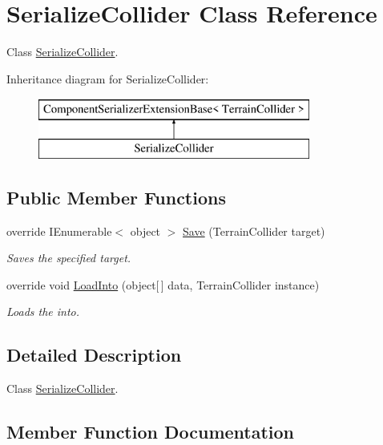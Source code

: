 \hypertarget{class_serialize_collider}{}\section{Serialize\+Collider Class Reference}
\label{class_serialize_collider}


Class \hyperlink{class_serialize_collider}{Serialize\+Collider}.  


Inheritance diagram for Serialize\+Collider\+:\begin{figure}[H]
\begin{center}
\leavevmode
\includegraphics[height=2.000000cm]{class_serialize_collider}
\end{center}
\end{figure}
\subsection*{Public Member Functions}
\begin{DoxyCompactItemize}
\item 
override I\+Enumerable$<$ object $>$ \hyperlink{class_serialize_collider_af8330f26c986a715cb6bad3a1e018d77}{Save} (Terrain\+Collider target)
\begin{DoxyCompactList}\small\item\em Saves the specified target. \end{DoxyCompactList}\item 
override void \hyperlink{class_serialize_collider_ac18a5c1da6864b2a473e4741a832dc53}{Load\+Into} (object\mbox{[}$\,$\mbox{]} data, Terrain\+Collider instance)
\begin{DoxyCompactList}\small\item\em Loads the into. \end{DoxyCompactList}\end{DoxyCompactItemize}


\subsection{Detailed Description}
Class \hyperlink{class_serialize_collider}{Serialize\+Collider}. 



\subsection{Member Function Documentation}
\mbox{\label{class_serialize_collider_ac18a5c1da6864b2a473e4741a832dc53}} 

